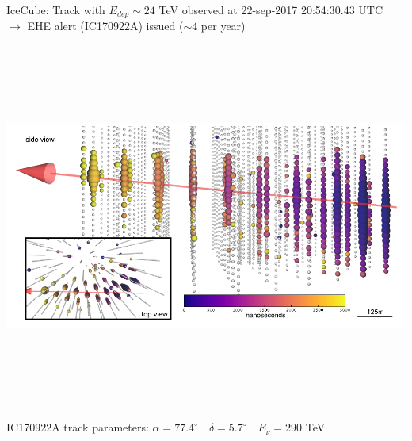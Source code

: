 \Tr
{\blue IceCube: Track with $E_{dep} \sim 24$ TeV observed at 22-sep-2017 20:54:30.43 UTC}\\
$\rightarrow$ EHE alert (IC170922A) issued ($\sim 4$ per year) 
\begin{center}
\includegraphics[keepaspectratio,height=12cm]{IC170922A-event}
\end{center}
IC170922A track parameters: $\alpha=77.4^{\circ} \quad \delta=5.7^{\circ} \quad E_{\nu}=290$ TeV
